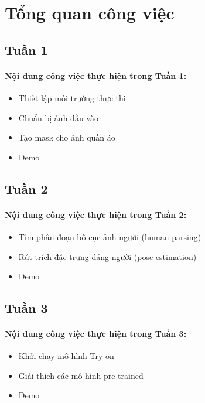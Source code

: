 \section{Tổng quan công việc}
\subsection{Tuần 1}
\paragraph{Nội dung công việc thực hiện trong Tuần 1:}
\begin{itemize}
\item Thiết lập môi trường thực thi
\item Chuẩn bị ảnh đầu vào
\item Tạo mask cho ảnh quần áo
\item Demo
\end{itemize}
\subsection{Tuần 2}
\paragraph{Nội dung công việc thực hiện trong Tuần 2:}
\begin{itemize}
\item Tìm phân đoạn bố cục ảnh người (human parsing)
\item Rút trích đặc trưng dáng người (pose estimation)
\item Demo
\end{itemize}
\subsection{Tuần 3}
\paragraph{Nội dung công việc thực hiện trong Tuần 3:}
\begin{itemize}
\item Khởi chạy mô hình Try-on
\item Giải thích các mô hình pre-trained
\item Demo
\end{itemize}






